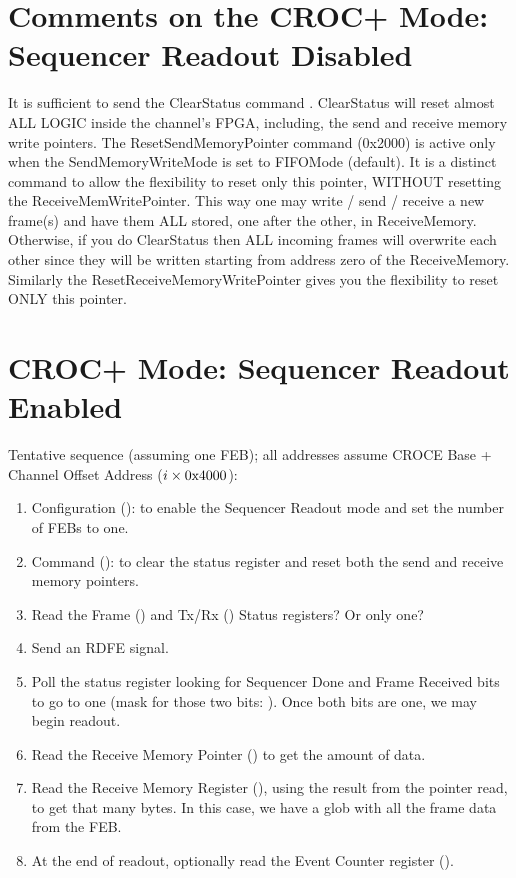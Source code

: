 \section{Comments on the CROC+ Mode: Sequencer Readout Disabled}

It is sufficient to send the ClearStatus command . ClearStatus will reset almost ALL LOGIC inside the channel's FPGA, including, the send and receive memory write pointers. The ResetSendMemoryPointer command (0x2000) is active only when the SendMemoryWriteMode is set to FIFOMode (default). It is a distinct command to allow the flexibility to reset only this pointer, WITHOUT resetting the ReceiveMemWritePointer. This way one may write / send / receive a new frame(s) and have them ALL stored, one after the other, in ReceiveMemory. Otherwise, if you do ClearStatus then ALL incoming frames will overwrite each other since they will be written starting from address zero of the ReceiveMemory. Similarly the ResetReceiveMemoryWritePointer  gives you the flexibility to reset ONLY this pointer.

\section{CROC+ Mode: Sequencer Readout Enabled}
\label{sec:seqreadenab}

Tentative sequence (assuming one FEB); all addresses assume CROCE Base + Channel Offset Address ($i \times \text{0x4000}$):
\begin{enumerate}
\item Configuration ():  to enable the Sequencer Readout mode and set the number of FEBs to one.
\item Command ():  to clear the status register and reset both the send and receive memory pointers.
\item Read the Frame () and Tx/Rx () Status registers? Or only one?
\item Send an RDFE signal.
\item Poll the status register looking for Sequencer Done and Frame Received bits to go to one (mask for those two bits: ). Once both bits are one, we may begin readout.
\item Read the Receive Memory Pointer () to get the amount of data.
\item Read the Receive Memory Register (), using the result from the pointer read, to get that many bytes. In this case, we have a glob with all the frame data from the FEB.
\item At the end of readout, optionally read the Event Counter register ().
\end{enumerate}

